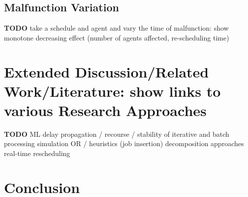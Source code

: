 \documentclass{article}
\begin{document}
\subsection{Malfunction Variation}\label{subsec:malfunction_variation}

\begin{mdframed}
{\bf TODO } take a schedule and agent and vary the time of malfunction: show monotone decreasing effect (number of agents affected, re-scheduling time)
\end{mdframed}




\section{Extended Discussion/Related Work/Literature: show links to various Research Approaches}

\begin{mdframed}
{\bf TODO}         ML
        delay propagation / recourse / stability of iterative and batch processing
        simulation
        OR / heuristics (job insertion)
        decomposition approaches
        real-time rescheduling

\end{mdframed}


\section{Conclusion}\label{sec:Conclusion}
\end{document}
